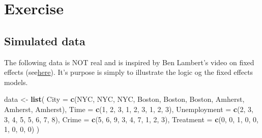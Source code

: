 \documentclass[
]{book}
\newenvironment{Shaded}{\begin{snugshade}}{\end{snugshade}}
\newcommand{\AttributeTok}[1]{\textcolor[rgb]{0.13,0.29,0.53}{#1}}
\newcommand{\DecValTok}[1]{\textcolor[rgb]{0.00,0.00,0.81}{#1}}
\newcommand{\FunctionTok}[1]{\textcolor[rgb]{0.13,0.29,0.53}{\textbf{#1}}}
\newcommand{\NormalTok}[1]{#1}
\newcommand{\OtherTok}[1]{\textcolor[rgb]{0.56,0.35,0.01}{#1}}
\newcommand{\StringTok}[1]{\textcolor[rgb]{0.31,0.60,0.02}{#1}}
\begin{document}
\hypertarget{exercise-4}{%
\section{Exercise}\label{exercise-4}}

\hypertarget{simulated-data-2}{%
\subsection{Simulated data}\label{simulated-data-2}}

The following data is NOT real and is inspired by Ben Lambert's video on fixed effects (see\href{https://www.youtube.com/watch?v=1SchyQ77VFg}{here}). It's purpose is simply to illustrate the logic og the fixed effects models.

\begin{Shaded}
\begin{Highlighting}[]
\NormalTok{data }\OtherTok{\textless{}{-}} \FunctionTok{list}\NormalTok{(}
  \AttributeTok{City =} \FunctionTok{c}\NormalTok{(}\StringTok{\textquotesingle{}NYC\textquotesingle{}}\NormalTok{, }\StringTok{\textquotesingle{}NYC\textquotesingle{}}\NormalTok{, }\StringTok{\textquotesingle{}NYC\textquotesingle{}}\NormalTok{, }\StringTok{\textquotesingle{}Boston\textquotesingle{}}\NormalTok{, }\StringTok{\textquotesingle{}Boston\textquotesingle{}}\NormalTok{, }\StringTok{\textquotesingle{}Boston\textquotesingle{}}\NormalTok{, }\StringTok{\textquotesingle{}Amherst\textquotesingle{}}\NormalTok{, }\StringTok{\textquotesingle{}Amherst\textquotesingle{}}\NormalTok{, }\StringTok{\textquotesingle{}Amherst\textquotesingle{}}\NormalTok{),}
  \AttributeTok{Time =} \FunctionTok{c}\NormalTok{(}\DecValTok{1}\NormalTok{, }\DecValTok{2}\NormalTok{, }\DecValTok{3}\NormalTok{, }\DecValTok{1}\NormalTok{, }\DecValTok{2}\NormalTok{, }\DecValTok{3}\NormalTok{, }\DecValTok{1}\NormalTok{, }\DecValTok{2}\NormalTok{, }\DecValTok{3}\NormalTok{),}
  \AttributeTok{Unemployment =} \FunctionTok{c}\NormalTok{(}\DecValTok{2}\NormalTok{, }\DecValTok{3}\NormalTok{, }\DecValTok{3}\NormalTok{, }\DecValTok{4}\NormalTok{, }\DecValTok{5}\NormalTok{, }\DecValTok{5}\NormalTok{, }\DecValTok{6}\NormalTok{, }\DecValTok{7}\NormalTok{, }\DecValTok{8}\NormalTok{),}
  \AttributeTok{Crime =} \FunctionTok{c}\NormalTok{(}\DecValTok{5}\NormalTok{, }\DecValTok{6}\NormalTok{, }\DecValTok{9}\NormalTok{, }\DecValTok{3}\NormalTok{, }\DecValTok{4}\NormalTok{, }\DecValTok{7}\NormalTok{, }\DecValTok{1}\NormalTok{, }\DecValTok{2}\NormalTok{, }\DecValTok{3}\NormalTok{),}
  \AttributeTok{Treatment =} \FunctionTok{c}\NormalTok{(}\DecValTok{0}\NormalTok{, }\DecValTok{0}\NormalTok{, }\DecValTok{1}\NormalTok{, }\DecValTok{0}\NormalTok{, }\DecValTok{0}\NormalTok{, }\DecValTok{1}\NormalTok{, }\DecValTok{0}\NormalTok{, }\DecValTok{0}\NormalTok{, }\DecValTok{0}\NormalTok{)}
\NormalTok{)}


\end{Highlighting}
\end{Shaded}
\end{document}
